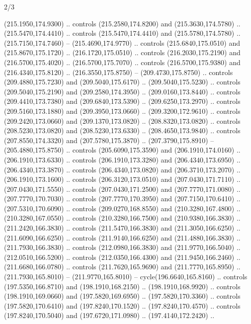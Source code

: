 \begin{flagdescription}{2/3}
\begin{scope}[xshift=0.5\flaglength,yshift=0.5\flagwidth,scale=\flagwidth/259.2]
\begin{scope}[y=0.8pt, x=0.8pt, yscale=-1,shift={(-243,-162)}]
      (215.1950,174.9300) .. controls (215.2580,174.8200) and (215.3630,174.5780) ..
      (215.5470,174.4410) .. controls (215.5470,174.4410) and (215.5780,174.5780) ..
      (215.7150,174.7460) -- (215.4690,174.9770) .. controls (215.6840,175.0510) and
      (215.8670,175.1720) .. (216.1720,175.0510) .. controls (216.2030,175.2190) and
      (216.5700,175.4020) .. (216.5700,175.7070) .. controls (216.5700,175.9380) and
      (216.4340,175.8120) .. (216.3550,175.8750) -- (209.4730,175.8750) .. controls
      (209.4880,175.7230) and (209.5040,175.6170) .. (209.5040,175.5230) .. controls
      (209.5040,175.2190) and (209.2580,174.3950) .. (209.0160,173.8440) .. controls
      (209.4410,173.7380) and (209.6840,173.5390) .. (209.6250,173.2970) .. controls
      (209.5160,173.1880) and (209.3950,173.0660) .. (209.3200,172.9610) .. controls
      (209.2420,173.0660) and (209.1370,173.0820) .. (208.8320,173.0820) .. controls
      (208.5230,173.0820) and (208.5230,173.6330) .. (208.4650,173.9840) .. controls
      (207.8550,174.3320) and (207.5780,175.3870) .. (207.3790,175.8910) --
      (205.4880,175.8750) .. controls (205.6090,175.3590) and (206.1910,174.0160) ..
      (206.1910,173.6330) .. controls (206.1910,173.3280) and (206.4340,173.6950) ..
      (206.4340,173.3870) .. controls (206.4340,173.0820) and (206.3710,173.2070) ..
      (206.1910,173.1600) .. controls (206.3120,173.0510) and (207.0430,171.7110) ..
      (207.0430,171.5550) .. controls (207.0430,171.2500) and (207.7770,171.0080) ..
      (207.7770,170.7030) .. controls (207.7770,170.3950) and (207.7150,170.6410) ..
      (207.5310,170.6090) .. controls (209.0270,168.8550) and (210.3280,167.4800) ..
      (210.3280,167.0550) .. controls (210.3280,166.7500) and (210.9380,166.3830) ..
      (211.2420,166.3830) .. controls (211.5470,166.3830) and (211.3050,166.6250) ..
      (211.6090,166.6250) .. controls (211.9140,166.6250) and (211.4880,166.3830) ..
      (211.7930,166.3830) .. controls (212.0980,166.3830) and (211.9770,166.5040) ..
      (212.0510,166.5200) .. controls (212.0350,166.4300) and (211.9450,166.2460) ..
      (211.6680,166.0780) .. controls (211.7620,165.9690) and (211.7770,165.8950) ..
      (211.7930,165.8010) -- (211.9770,165.8010) -- cycle(196.6640,165.8160) ..
      controls (197.5350,166.8710) and (198.1910,168.2150) .. (198.1910,168.9920) ..
      controls (198.1910,169.0660) and (197.5820,169.6950) .. (197.5820,170.3360) ..
      controls (197.5820,170.6410) and (197.8240,170.1520) .. (197.8240,170.4570) ..
      controls (197.8240,170.5040) and (197.6720,171.0980) .. (197.4140,172.2420) ..

\end{scope}
\end{scope}
\end{flagdescription}
